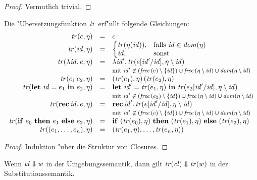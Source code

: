 \documentclass[12pt,fleqn,a4paper]{article}
\newcommand{\cl}{\name{cl}}
\begin{document}
\begin{proof}
  Vermutlich trivial.
\end{proof}

\begin{lemma}
  Die "Ubersetzungsfunktion $\name{tr}$ erf"ullt folgende Gleichungen:
  \[\begin{array}{rcl}
    \tr{c,\eta} &=& c \\
    \tr{\id,\eta} &=& \bcase \tr{\eta(\id)}, & \text{falls } \id\in\dom{\eta} \\ \id, & \text{sonst} \ecase \\
    \tr{\abstr{\id}{e},\eta} &=& \abstr{\id'}{\tr{e[\id'/\id],\eta \setminus \id}} \\
      && \text{\footnotesize{mit
          $\id'\not\in(\free{e}\setminus\{\id\}) \cup \free{\eta\setminus\id} \cup \dom{\eta\setminus\id}$}} \\
    \tr{\app{e_1}{e_2},\eta} &=& \app{(\tr{e_1},\eta)}{(\tr{e_2},\eta)} \\
    \tr{\bli{\id}{e_1}{e_2},\eta} &=& \bli{\id'}{\tr{e_1,\eta}}{\tr{e_2[\id'/\id],\eta \setminus \id}} \\
      && \text{\footnotesize{mit
          $\id'\not\in(\free{e_2}\setminus\{\id\}) \cup \free{\eta\setminus\id} \cup \dom{\eta\setminus\id}$}} \\
    \tr{\rec{\id}{e},\eta} &=& \rec{\id'}{\tr{e[\id'/\id],\eta \setminus \id}} \\
      && \text{\footnotesize{mit
          $\id'\not\in(\free{e}\setminus\{\id\}) \cup \free{\eta\setminus\id} \cup \dom{\eta\setminus\id}$}} \\
    \tr{\bifte{e_0}{e_1}{e_2},\eta} &=& \bifte{(\tr{e_0},\eta)}{(\tr{e_1},\eta)}{(\tr{e_2},\eta)} \\
    \tr{(e_1,\ldots,e_n),\eta} &=& (\tr{e_1,\eta},\ldots,\tr{e_n,\eta}) \\
  \end{array}\]
\end{lemma}

\begin{proof}
  Induktion "uber die Struktur von Closures.
\end{proof}

\begin{theorem} \label{theorem:Korr}
  Wenn $\cl \Downarrow w$ in der Umgebungssemantik, dann gilt $\tr{\cl} \Downarrow \tr{w}$ in der
  Substitutionssemantik.
\end{theorem}
\end{document}
